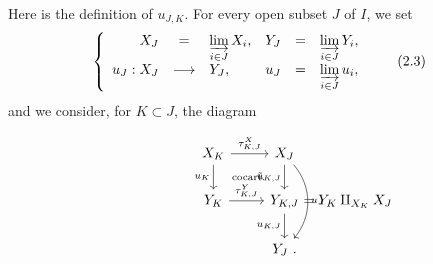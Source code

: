 Here is the definition of $u_{J,K}$. For every open subset $J$ of $I$, we set
\[
\left\{
\begin{array}{rclrcl}
X_J & = & \varinjlim\limits_{i\in J} X_i, & Y_J & = & \varinjlim\limits_{i\in J} Y_i,\\[2ex]
u_J : X_J & \longrightarrow & Y_J, & u_J & = & \varinjlim\limits_{i\in J} u_i,
\end{array}
\right.
\tag*{(2.3)}
\]
and we consider, for $K \subset J$, the diagram



\[
\begin{tikzcd}
X_K \arrow[r, "\tau^X_{K,J}"] \arrow[d, "u_K"'] \arrow[dr, phantom, "\text{\scriptsize cocart.}"] & X_J \arrow[d, "\tilde{u}_{K,J}"'] \arrow[dd, bend left=40, "u_J"] \\
Y_K \arrow[r, "\tau^Y_{K,J}"] & Y_{K,J} \rlap{$\ = Y_K \amalg_{X_K} X_J$} \arrow[d, "u_{K,J}"'] \\
 & Y_J \ .
\end{tikzcd}
\]

